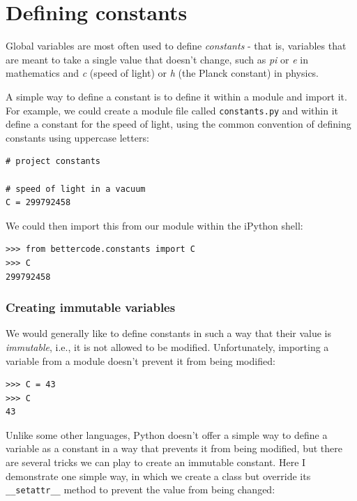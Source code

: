 \section{Defining constants}

Global variables are most often used to define \textit{constants} - that is, variables that are meant to take a single value that doesn't change, such as \textit{pi} or \textit{e} in mathematics and \textit{c} (speed of light) or \textit{h} (the Planck constant) in physics.

A simple way to define a constant is to define it within a module and import it.
For example, we could create a module file called \texttt{constants.py} and within it define a constant for the speed of light, using the common convention of defining constants using uppercase letters:

\begin{lstlisting}[style=Pythonshort]
# project constants

# speed of light in a vacuum
C = 299792458
\end{lstlisting}

We could then import this from our module within the iPython shell:

\begin{lstlisting}[style=replshort]
>>> from bettercode.constants import C
>>> C
299792458
\end{lstlisting}

\subsubsection{Creating immutable variables}

We would generally like to define constants in such a way that their value is \textit{immutable}, i.e., it is not allowed to be modified.
Unfortunately, importing a variable from a module doesn't prevent it from being modified:

\begin{lstlisting}[style=replshort]
>>> C = 43
>>> C
43
\end{lstlisting}

Unlike some other languages, Python doesn't offer a simple way to define a variable as a constant in a way that prevents it from being modified, but there are several tricks we can play to create an immutable constant.
Here I demonstrate one simple way, in which we create a class but override its \texttt{\_\_setattr\_\_} method to prevent the value from being changed:

